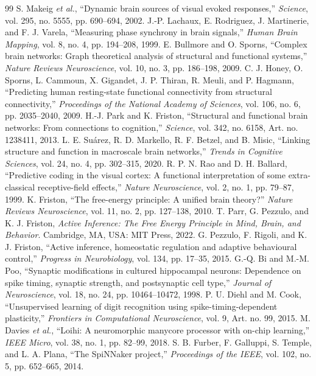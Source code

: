 \documentclass[journal]{IEEEtran}
\begin{document}
\begin{thebibliography}{99}
 S. Makeig \emph{et al.}, ``Dynamic brain sources of visual evoked responses,'' \emph{Science}, vol. 295, no. 5555, pp. 690--694, 2002.
 J.-P. Lachaux, E. Rodriguez, J. Martinerie, and F. J. Varela, ``Measuring phase synchrony in brain signals,'' \emph{Human Brain Mapping}, vol. 8, no. 4, pp. 194--208, 1999.
 E. Bullmore and O. Sporns, ``Complex brain networks: Graph theoretical analysis of structural and functional systems,'' \emph{Nature Reviews Neuroscience}, vol. 10, no. 3, pp. 186--198, 2009.
 C. J. Honey, O. Sporns, L. Cammoun, X. Gigandet, J. P. Thiran, R. Meuli, and P. Hagmann, ``Predicting human resting-state functional connectivity from structural connectivity,'' \emph{Proceedings of the National Academy of Sciences}, vol. 106, no. 6, pp. 2035--2040, 2009.
 H.-J. Park and K. Friston, ``Structural and functional brain networks: From connections to cognition,'' \emph{Science}, vol. 342, no. 6158, Art. no. 1238411, 2013.
 L. E. Su\'arez, R. D. Markello, R. F. Betzel, and B. Misic, ``Linking structure and function in macroscale brain networks,'' \emph{Trends in Cognitive Sciences}, vol. 24, no. 4, pp. 302--315, 2020.
 R. P. N. Rao and D. H. Ballard, ``Predictive coding in the visual cortex: A functional interpretation of some extra-classical receptive-field effects,'' \emph{Nature Neuroscience}, vol. 2, no. 1, pp. 79--87, 1999.
 K. Friston, ``The free-energy principle: A unified brain theory?'' \emph{Nature Reviews Neuroscience}, vol. 11, no. 2, pp. 127--138, 2010.
 T. Parr, G. Pezzulo, and K. J. Friston, \emph{Active Inference: The Free Energy Principle in Mind, Brain, and Behavior}. Cambridge, MA, USA: MIT Press, 2022.
 G. Pezzulo, F. Rigoli, and K. J. Friston, ``Active inference, homeostatic regulation and adaptive behavioural control,'' \emph{Progress in Neurobiology}, vol. 134, pp. 17--35, 2015.
 G.-Q. Bi and M.-M. Poo, ``Synaptic modifications in cultured hippocampal neurons: Dependence on spike timing, synaptic strength, and postsynaptic cell type,'' \emph{Journal of Neuroscience}, vol. 18, no. 24, pp. 10464--10472, 1998.
 P. U. Diehl and M. Cook, ``Unsupervised learning of digit recognition using spike-timing-dependent plasticity,'' \emph{Frontiers in Computational Neuroscience}, vol. 9, Art. no. 99, 2015.
 M. Davies \emph{et al.}, ``Loihi: A neuromorphic manycore processor with on-chip learning,'' \emph{IEEE Micro}, vol. 38, no. 1, pp. 82--99, 2018.
 S. B. Furber, F. Galluppi, S. Temple, and L. A. Plana, ``The SpiNNaker project,'' \emph{Proceedings of the IEEE}, vol. 102, no. 5, pp. 652--665, 2014.
\end{thebibliography}
\end{document}
